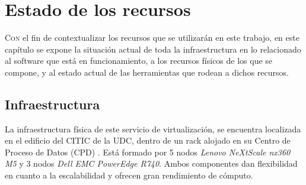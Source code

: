 \chapter{Estado de los recursos}
\label{chap:estadoInfraestructuraSistema}
\lettrine{C}{on} el fin de contextualizar los recursos que se utilizarán en este trabajo, en este capítulo se expone la situación actual de toda la infraestructura en lo relacionado al software que está en funcionamiento, a los recursos físicos de los que se compone, y al estado actual de las herramientas que rodean a dichos recursos.

\section{Infraestructura}
La infraestructura física de este servicio de virtualización, se encuentra localizada en el edificio del CITIC de la UDC, dentro de un rack alojado en su Centro de Proceso de Datos (CPD) \cite{citicUDC}. Está formado por 5 nodos \textit{Lenovo NeXtScale nx360 M5} y 3 nodos \textit{Dell EMC PowerEdge R740}. Ambos componentes dan flexibilidad en cuanto a la escalabilidad y ofrecen gran rendimiento de cómputo.\\

